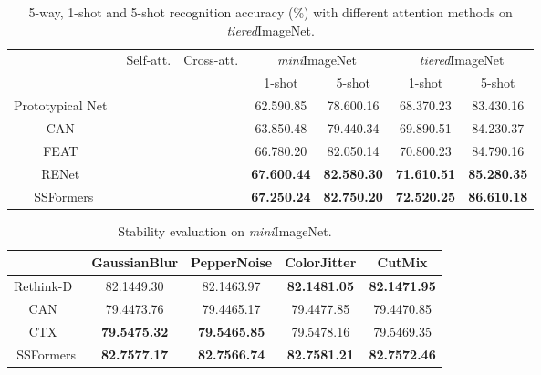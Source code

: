 \documentclass{SCIS2019}
\begin{document}
	\begin{table}[t]
		\centering
		\caption{5-way, 1-shot and 5-shot recognition accuracy (\%) with different attention methods on \emph{tiered}ImageNet.}
		\begin{tabular*}{\hsize}{@{}@{\extracolsep{\fill}}ccccccc@{}}
			\toprule
			\label{parameter}
			\multirow{2}{*}{Method} &\multirow{2}{*}{Self-att.} 
			&\multirow{2}{*}{Cross-att.}&\multicolumn{2}{c}{\emph{mini}ImageNet} &\multicolumn{2}{c}{\emph{tiered}ImageNet} \\
			&&&1-shot&5-shot&1-shot&5-shot\\
			\midrule	
			Prototypical Net~\cite{7}&&& 62.59\footnotesize{0.85} & 78.60\footnotesize{0.16}& 68.37\footnotesize{0.23} & 83.43\footnotesize{0.16}\\
			CAN~\cite{14}&&\CheckmarkBold&  63.85\footnotesize{0.48}& 79.44\footnotesize{0.34} & 69.89\footnotesize{0.51}& 84.23\footnotesize{0.37} \\
			FEAT~\cite{19}&&\CheckmarkBold&  66.78\footnotesize{0.20}& 82.05\footnotesize{0.14}& 70.80\footnotesize{0.23}& 84.79\footnotesize{0.16}\\
			RENet~\cite{10}&\CheckmarkBold&\CheckmarkBold& \textbf{67.60\footnotesize{0.44}} & \textbf{82.58\footnotesize{0.30}} & \textbf{71.61\footnotesize{0.51}}& \textbf{85.28\footnotesize{0.35}}\\	
			SSFormers&&\CheckmarkBold &\textbf{67.25\footnotesize{0.24}}  & \textbf{82.75\footnotesize{0.20}}  &\textbf{72.52\footnotesize{0.25}}  & \textbf{86.61\footnotesize{0.18}}\\
			\bottomrule
		\end{tabular*}
	\end{table}
	
	\begin{table}[t]
		\centering
		\caption{Stability evaluation on \emph{mini}ImageNet.}
		\begin{tabular*}{\hsize}{@{}@{\extracolsep{\fill}}ccccc@{}}
			\toprule
			\label{stable}    
			& GaussianBlur & PepperNoise & ColorJitter &  CutMix \\
			\midrule	
			Rethink-D~\cite{40} &82.1449.30 &82.1463.97 &\textbf{82.1481.05}&\textbf{82.1471.95}\\ 
			CAN~\cite{14} &79.4473.76 &79.4465.17 & 79.4477.85 &79.4470.85\\ 
			CTX~\cite{21} &\textbf{79.5475.32}  &\textbf{79.5465.85} & 79.5478.16 &79.5469.35\\ 
			SSFormers &\textbf{82.7577.17}&\textbf{82.7566.74} &\textbf{82.7581.21}&\textbf{82.7572.46} \\	 				
			\bottomrule				
			\bottomrule
		\end{tabular*}
	\end{table}
	
\end{document}
